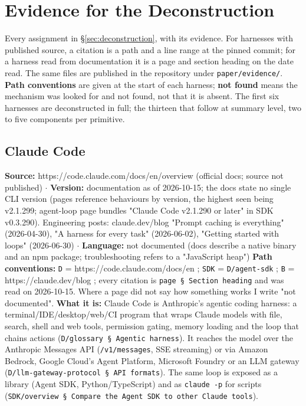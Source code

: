\section{Evidence for the Deconstruction}
Every assignment in \S\ref{sec:deconstruction}, with its evidence. For harnesses with published source, a citation is a path and a line range at the pinned commit; for a harness read from documentation it is a page and section heading on the date read. The same files are published in the repository under \texttt{paper/evidence/}. \textbf{Path conventions} are given at the start of each harness; \textbf{not found} means the mechanism was looked for and not found, not that it is absent. The first six harnesses are deconstructed in full; the thirteen that follow at summary level, two to five components per primitive.
\small
\subsection{Claude Code}

\textbf{Source:} https://code.claude.com/docs/en/overview (official docs; source not published) $\cdot$ \textbf{Version:} documentation as of 2026-10-15; the docs state no single CLI version (pages reference behaviours by version, the highest seen being v2.1.299; agent-loop page bundles "Claude Code v2.1.290 or later" in SDK v0.3.290). Engineering posts: claude.dev/blog "Prompt caching is everything" (2026-04-30), "A harness for every task" (2026-06-02), "Getting started with loops" (2026-06-30) $\cdot$ \textbf{Language:} not documented (docs describe a native binary and an npm package; troubleshooting refers to a "JavaScript heap")
\textbf{Path conventions:} \texttt{D} = https://code.claude.com/docs/en ; \texttt{SDK} = \texttt{D/\allowbreak{}agent-\allowbreak{}sdk} ; \texttt{B} = https://claude.dev/blog ; every citation is \texttt{page § Section heading} and was read on 2026-10-15. Where a page did not say how something works I write "not documented".
\textbf{What it is:} Claude Code is Anthropic's agentic coding harness: a terminal/IDE/desktop/web/CI program that wraps Claude models with file, search, shell and web tools, permission gating, memory loading and the loop that chains actions (\texttt{D/\allowbreak{}glossary § Agentic harness}). It reaches the model over the Anthropic Messages API (\texttt{/\allowbreak{}v1/\allowbreak{}messages}, SSE streaming) or via Amazon Bedrock, Google Cloud's Agent Platform, Microsoft Foundry or an LLM gateway (\texttt{D/\allowbreak{}llm-\allowbreak{}gateway-\allowbreak{}protocol § API formats}). The same loop is exposed as a library (Agent SDK, Python/TypeScript) and as \texttt{claude -\allowbreak{}p} for scripts (\texttt{SDK/\allowbreak{}overview § Compare the Agent SDK to other Claude tools}).

